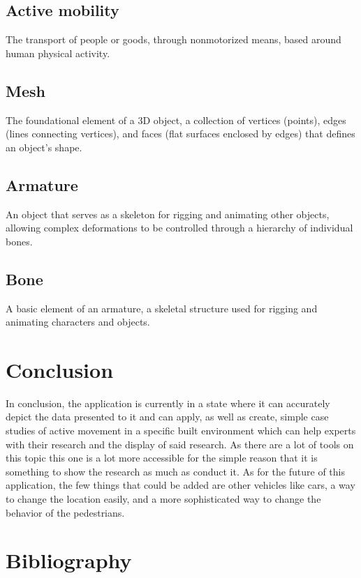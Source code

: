 \documentclass[letterpaper,10pt,english]{jupyterBook}
\begin{document}
\section{Active mobility}
\label{\detokenize{glossary:active-mobility}}
\sphinxAtStartPar
The transport of people or goods, through non\sphinxhyphen{}motorized means, based around human physical activity.


\section{Mesh}
\label{\detokenize{glossary:mesh}}
\sphinxAtStartPar
The foundational element of a 3D object, a collection of vertices (points), edges (lines connecting vertices), and faces (flat surfaces enclosed by edges) that defines an object’s shape.


\section{Armature}
\label{\detokenize{glossary:armature}}
\sphinxAtStartPar
An object that serves as a skeleton for rigging and animating other objects, allowing complex deformations to be controlled through a hierarchy of individual bones.


\section{Bone}
\label{\detokenize{glossary:bone}}
\sphinxAtStartPar
A basic element of an armature, a skeletal structure used for rigging and animating characters and objects.

\sphinxstepscope


\chapter{Conclusion}
\label{\detokenize{Conclusion:conclusion}}\label{\detokenize{Conclusion::doc}}
\sphinxAtStartPar
In conclusion, the application is currently in a state where it can accurately depict the data presented to it and can apply, as well as create, simple case studies of active movement in a specific built environment which can help experts with their research and the display of said research. As there are a lot of tools on this topic this one is a lot more accessible for the simple reason that it is something to show the research as much as conduct it. As for the future of this application, the few things that could be added are other vehicles like cars, a way to change the location easily, and a more sophisticated way to change the behavior of the pedestrians.

\sphinxstepscope


\chapter{Bibliography}
\label{\detokenize{bibliography:bibliography}}\label{\detokenize{bibliography::doc}}\label{\detokenize{bibliography:id1}}






\renewcommand{\indexname}{Index}
\printindex
\end{document}
